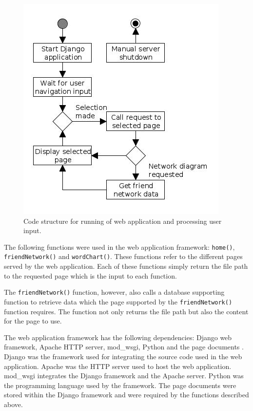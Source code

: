 \documentclass[12pt,onecolumn]{article}
\begin{document}
	\begin{figure}[h] 
		\centering
		\includegraphics[scale=1]{djangostruc}
		\caption{Code structure for running of web application and processing user input.} \label{fig:django}
	\end{figure}
	
	The following functions were used in the web application framework: \texttt{home()}, \texttt{friendNetwork()} and \texttt{wordChart()}. These functions refer to the different pages served by the web application. Each of these functions simply return the file path to the requested page which is the input to each function.
	
	The \texttt{friendNetwork()} function, however, also calls a database supporting function to retrieve data which the page supported by the \texttt{friendNetwork()} function requires. The function not only returns the file path but also the content for the page to use.
	
	The web application framework has the following dependencies: Django web framework, Apache HTTP server, mod\_wsgi, Python  and the page documents \cite{django, apache, wsgi}. Django was the framework used for integrating the source code used in the web application. Apache was the HTTP server used to host the web application. mod\_wsgi integrates the Django framework and the Apache server. Python was the programming language used by the framework. The page documents were stored within the Django framework and were required by the functions described above. 
	
\end{document}
